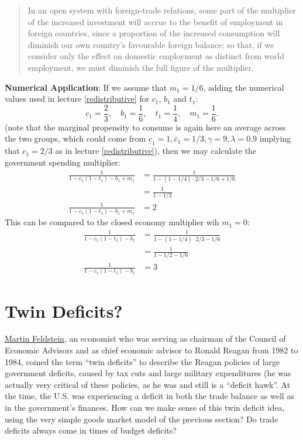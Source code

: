 \documentclass[]{book}
\begin{document}
\begin{quote}
In an open system with foreign-trade relations, some part of the
multiplier of the increased investment will accrue to the benefit of
employment in foreign countries, since a proportion of the increased
consumption will diminish our own country's favourable foreign balance;
so that, if we consider only the effect on domestic employment as
distinct from world employment, we must diminish the full figure of the
multiplier.
\end{quote}

\textbf{Numerical Application}: If we assume that \(m_1=1/6\), adding
the numerical values used in lecture \ref{redistributive} for \(c_1\),
\(b_1\) and \(t_1\):
\[c_1 = \frac{2}{3},\quad b_1=\frac{1}{6}, \quad t_1=\frac{1}{4}, \quad m_1=\frac{1}{6}.\]
(note that the marginal propensity to consume is again here an average
across the two groups, which could come from
\(\underline{c}_{1}=1, \bar{c}_{1}=1/3, \gamma=9, \lambda=0.9\) implying
that \(c_1=2/3\) as in lecture \ref{redistributive}), then we may
calculate the government spending multiplier: \[
\begin{aligned}
\frac{1}{1-c_1(1-t_1)-b_1+m_1}&=\frac{1}{1-(1-1/4) \cdot 2/3-1/6 +1/6}\\
&= \frac{1}{1-1/2}\\
\frac{1}{1-c_1(1-t_1)-b_1+m_1}&=2
\end{aligned}
\] This can be compared to the closed economy multiplier wih \(m_1=0\):
\[
\begin{aligned}
\frac{1}{1-c_1(1-t_1)-b_1}&=\frac{1}{1-(1-1/4) \cdot 2/3-1/6}\\
&= \frac{1}{1-1/2-1/6}\\
\frac{1}{1-c_1(1-t_1)-b_1}&=3
\end{aligned}
\]

\section{Twin Deficits?}\label{twin-deficits}

\href{https://en.wikipedia.org/wiki/Martin_Feldstein}{Martin Feldstein},
an economist who was serving as chairman of the Council of Economic
Advisors and as chief economic advisor to Ronald Reagan from 1982 to
1984, coined the term ``twin deficits'' to describe the Reagan policies
of large government deficits, caused by tax cuts and large military
expenditures (he was actually very critical of these policies, as he was
and still is a ``deficit hawk''. At the time, the U.S. was experiencing
a deficit in both the trade balance as well as in the government's
finances. How can we make sense of this twin deficit idea, using the
very simple goods market model of the previous section? Do trade
deficits always come in times of budget deficits?
\end{document}
